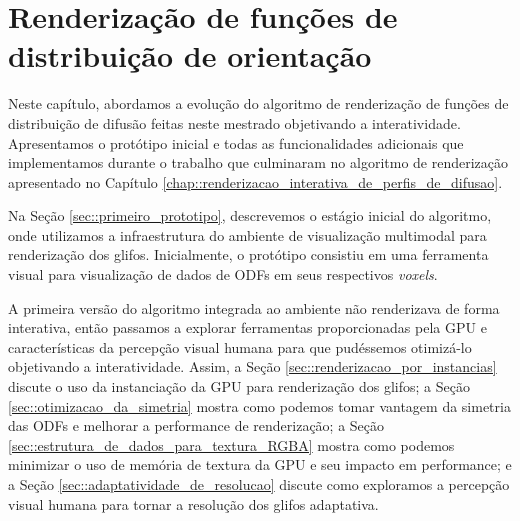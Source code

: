 \documentclass[
    12pt,                %
    oneside,            %
    a4paper,            %
    english,            %
    french,                %
    spanish,            %
    brazil                %
    ]{abntex2}
\begin{document}



\chapter{Renderização de funções de distribuição de orientação}
\label{chap::renderizacao_de_perfis_de_difusao}

Neste capítulo, abordamos a evolução do algoritmo de renderização de funções de distribuição de difusão feitas neste mestrado objetivando a interatividade. Apresentamos o protótipo inicial e todas as funcionalidades adicionais que implementamos durante o trabalho que culminaram no algoritmo de renderização apresentado no Capítulo \ref{chap::renderizacao_interativa_de_perfis_de_difusao}.


Na Seção \ref{sec::primeiro_prototipo}, descrevemos o estágio inicial do algoritmo, onde utilizamos a infraestrutura do ambiente de visualização multimodal para renderização dos glifos. Inicialmente, o protótipo consistiu em uma ferramenta visual para visualização de dados de ODFs em seus respectivos \textit{voxels}.

A primeira versão do algoritmo integrada ao ambiente não renderizava de forma interativa, então passamos a explorar ferramentas proporcionadas pela GPU e características da percepção visual humana para que pudéssemos otimizá-lo objetivando a interatividade. Assim, a Seção \ref{sec::renderizacao_por_instancias} discute o uso da instanciação da GPU para renderização dos glifos; a Seção \ref{sec::otimizacao_da_simetria} mostra como podemos tomar vantagem da simetria das ODFs e melhorar a performance de renderização; a Seção \ref{sec::estrutura_de_dados_para_textura_RGBA} mostra como podemos minimizar o uso de memória de textura da GPU e seu impacto em performance; e a Seção \ref{sec::adaptatividade_de_resolucao} discute como exploramos a percepção visual humana para tornar a resolução dos glifos adaptativa.
\end{document}
